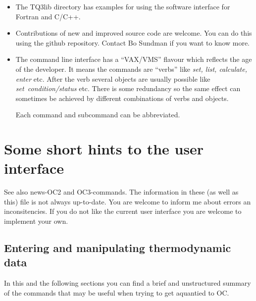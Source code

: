 \documentclass[12pt]{article}
\begin{document}
\begin{itemize}
\item The TQ3lib directory has examples for using the software
  interface for Fortran and C/C++.

\item Contributions of new and improved source code are welcome.  You
  can do this using the github repository.  Contact Bo Sundman if you
  want to know more.

\item The command line interface has a ``VAX/VMS'' flavour which
  reflects the age of the developer.  It means the commands are
  ``verbs'' like {\em set, list, calculate, enter} etc.  After the
  verb several objects are usually possible like {\em
    set~condition/status} etc.  There is some redundancy so the same
  effect can sometimes be achieved by different combinations of verbs
  and objects.

  Each command and subcommand can be abbreviated.

\end{itemize}

\section{Some short hints to the user interface}

See also news-OC2 and OC3-commands.  The information in these (as well
as this) file is not always up-to-date.  You are welcome to inform me
about errors an inconsitencies.  If you do not like the current user
interface you are welcome to implement your own.

\subsection{Entering and manipulating thermodynamic data}

In this and the following sections you can find a brief and
unstructured summary of the commands that may be useful when trying to
get aquantied to OC.
\end{document}
